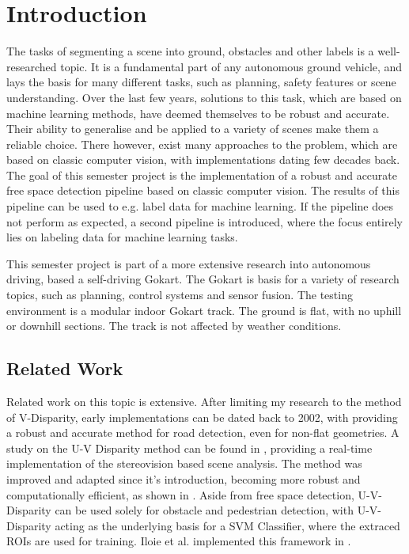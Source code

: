 
\chapter{Introduction}
\label{chp:Introduction}

The tasks of segmenting a scene into ground, obstacles and other labels is a well-researched topic. It is a fundamental part of any autonomous ground vehicle, and lays the basis for many different tasks, such as planning, safety features or scene understanding. Over the last few years, solutions to this task, which are based on machine learning methods, have deemed themselves to be robust and accurate. Their ability to generalise and be applied to a variety of scenes make them a reliable choice. There however, exist many approaches to the problem, which are based on classic computer vision, with implementations dating few decades back. \newline
The goal of this semester project is the implementation of a robust and accurate free space detection pipeline based on classic computer vision. The results of this pipeline can be used to e.g. label data for machine learning. If the pipeline does not perform as expected, a second pipeline is introduced, where the focus entirely lies on labeling data for machine learning tasks. 

This semester project is part of a more extensive research into autonomous driving, based a self-driving Gokart. The Gokart is basis for a variety of research topics, such as planning, control systems and sensor fusion. The testing environment is a modular indoor Gokart track. The ground is flat, with no uphill or downhill sections. The track is not affected by weather conditions. 
\newline


\section{Related Work}
Related work on this topic is extensive. After limiting my research to the method of V-Disparity, early implementations can be dated back to 2002, with \cite{V-disparity_nonflat} providing a robust and accurate method for road detection, even for non-flat geometries. A study on the U-V Disparity method can be found in \cite{Hu2005}, providing a real-time implementation of the stereovision based scene analysis. The method was improved and adapted since it's introduction, becoming more robust and computationally efficient, as shown in \cite{Kakegawa2018}. Aside from free space detection, U-V-Disparity can be used solely for obstacle and pedestrian detection, with U-V-Disparity acting as the underlying basis for a SVM Classifier, where the extraced ROIs are used for training. Iloie et al. implemented this framework in \cite{Iloie2014}.